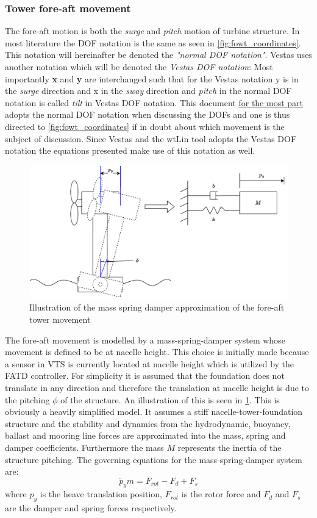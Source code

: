 \subsubsection{Tower fore-aft movement} \label{sec:comp_foreaft_mod}
The fore-aft motion is both the \textit{surge} and \textit{pitch} motion of turbine structure. In most literature the DOF notation is the same as seen in \cref{fig:fowt_coordinates}. This notation will hereinafter be denoted the \textit{"normal DOF notation"}. Vestas uses another notation which will be denoted the \textit{Vestas DOF notation}: Most importantly \textbf{x} and \textbf{y} are interchanged such that for the Vestas notation y is in the \textit{surge} direction and x in the \textit{sway} direction and \textit{pitch} in the normal DOF notation is called \textit{tilt} in Vestas DOF notation. This document \underline{for the most part} adopts the normal DOF notation when discussing the DOFs and one is thus directed to \cref{fig:fowt_coordinates} if in doubt about which movement is the subject of discussion. Since Vestas and the wtLin tool adopts the Vestas DOF notation the equations presented make use of this notation as well.
\begin{figure}[ht]
	\centering
	\includegraphics[width=0.9\linewidth]{Graphics/wtLinForeAftMotionModel.pdf}
	\caption{Illustration of the mass spring damper approximation of the fore-aft tower movement}
	\label{fig:wtLin_fore-aft_diagram}
\end{figure}
The fore-aft movement is modelled by a mass-spring-damper system whose movement is defined to be at nacelle height. This choice is initially made because a sensor in VTS is currently located at nacelle height which is utilized by the FATD controller. For simplicity it is assumed that the foundation does not translate in any direction and therefore the translation at nacelle height is due to the pitching $ \phi $ of the structure. An illustration of this is seen in \cref{fig:wtLin_fore-aft_diagram}. This is obviously a heavily simplified model. It assumes a stiff nacelle-tower-foundation structure and the stability and dynamics from the hydrodynamic, buoyancy, ballast and mooring line forces are approximated into the mass, spring and damper coefficients. Furthermore the mass $ M $ represents the inertia of the structure pitching. The governing equations for the mass-spring-damper system are:
\begin{equation}\label{eq:comp_fore-aft_ay1}
	\ddot{p}_y m = F_{rot} - F_d + F_s
\end{equation}
where $ p_y $ is the heave translation position, $ F_{rot} $ is the rotor force and $ F_d $ and $ F_s $ are the damper and spring forces respectively.

